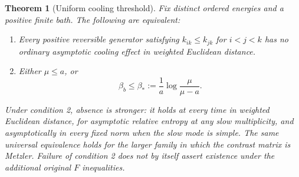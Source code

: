 \documentclass[11pt]{article}
\newtheorem{theorem}{Theorem}
\begin{document}
\begin{theorem}[Uniform cooling threshold]\label{thm:energythreshold}
Fix distinct ordered energies and a positive finite bath. The following are
equivalent:
\begin{enumerate}
\item Every positive reversible generator satisfying
$k_{ik}\leq k_{jk}$ for $i<j<k$ has no ordinary asymptotic cooling effect
in weighted Euclidean distance.
\item Either $\mu\leq a$, or
\begin{equation}\label{eq:energythreshold}
\beta_b\leq\beta_*:=\frac1a\log\frac{\mu}{\mu-a}.
\end{equation}
\end{enumerate}
Under condition 2, absence is stronger: it holds at every time in weighted
Euclidean distance, for asymptotic relative entropy at any slow multiplicity,
and asymptotically in every fixed norm when the slow mode is simple. The
same universal equivalence holds for the larger family in which the
contrast matrix is Metzler. Failure of condition 2 does not by itself assert
existence under the additional original $F$ inequalities.
\end{theorem}
\end{document}
